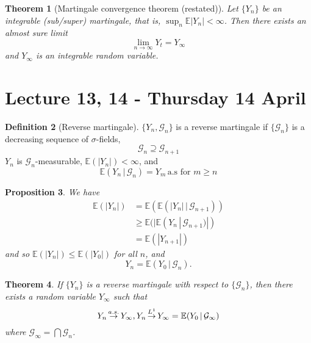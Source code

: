 \documentclass[10pt, oneside, reqno]{amsart}
\theoremstyle{plain}%
\newtheorem{thm}{Theorem}[section]
\newtheorem{prop}[thm]{Proposition}
\theoremstyle{definition}
\newtheorem{defn}[thm]{Definition}
\theoremstyle{remark}
\newcommand{\given}{ \, | \,}
\newcommand{\E}{\mathbb{E}}
\def\cas{\,{\buildrel a.s. \over \rightarrow}\,}
\def\clone{\,{\buildrel L^1 \over \rightarrow}\,}
\newcommand{\sigg}{\mathcal{G}}
\begin{document}
\begin{thm}[Martingale convergence theorem (restated)]
	Let $\{Y_n\}$ be an integrable (sub/super) martingale, that is, $\sup_n \E |Y_n| < \infty$.  Then there exists an almost sure limit \[
		\lim_{n \rightarrow \infty} Y_t = Y_\infty
	\] and $Y_\infty$ is an integrable random variable.
\end{thm}

\section{Lecture 13, 14 - Thursday 14 April} %
\label{sec:lecture_13_thursday_14_april}

\begin{defn}[Reverse martingale]
	$\{ Y_n , \sigg_n \}$ is a reverse martingale if $ \{ \sigg_n \}$ is a decreasing sequence of $\sigma$-fields, \[
		\sigg_n \supseteq \sigg_{n+1}
	\] $Y_n$ is $\sigg_n$-measurable, $\E(|Y_n|) < \infty$, and \[
		\E(Y_n \given \sigg_n) = Y_m \, \text{a.s for $m \geq n$}
	\]
\end{defn}

\begin{prop}
	We have \begin{align*}
		\E(|Y_n|) &= \E( \E(|Y_n| \given \sigg_{n+1})) \\
					&\geq \E(| \E(Y_n \given \sigg_{n+1})|) \\
					&= \E(|Y_{n+1}|)
	\end{align*}
	and so $\E(|Y_n|) \leq \E(|Y_0|)$ for all $n$, and \[
		Y_n = \E(Y_0 \given \sigg_n).
	\]
\end{prop}

\begin{thm}
	If $\{ Y_n \}$ is a reverse martingale with respect to $\{\sigg_n \}$, then there exists a random variable $Y_\infty$ such that \[
		Y_n \cas Y_\infty, Y_n \clone Y_\infty = \E(Y_0 \given \sigg_\infty)
	\] where $\sigg_\infty = \bigcap {\sigg_n}$.
\end{thm}
\end{document}
